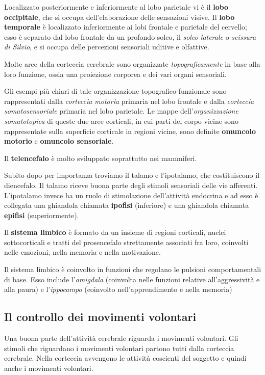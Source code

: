 \documentclass[]{article}
\begin{document}
Localizzato posteriormente e inferiormente al lobo parietale vi è il
\textbf{lobo occipitale}, che si occupa dell'elaborazione delle
sensazioni visive. Il \textbf{lobo temporale} è localizzato
inferiormente ai lobi frontale e parietale del cervello; esso è separato
dal lobo frontale da un profondo solco, il \emph{solco laterale} o
\emph{scissura di Silvio}, e si occupa delle percezioni sensoriali
uditive e olfattive.

Molte aree della corteccia cerebrale sono organizzate
\emph{topograficamente} in base alla loro funzione, ossia una proiezione
corporea e dei vari organi sensoriali.

Gli esempi più chiari di tale organizzazione topografico-funzionale sono
rappresentati dalla \emph{corteccia motoria} primaria nel lobo frontale
e dalla \emph{corteccia somatosensoriale} primaria nel lobo parietale.
Le mappe dell'\emph{organizzazione somatotopica} di queste due aree
corticali, in cui parti del corpo vicine sono rappresentate sulla
superficie corticale in regioni vicine, sono definite \textbf{omuncolo
motorio} e \textbf{omuncolo sensoriale}.

Il \textbf{telencefalo} è molto sviluppato soprattutto nei mammiferi.

Subito dopo per importanza troviamo il talamo e l'ipotalamo, che
costituiscono il diencefalo. Il talamo riceve buona parte degli stimoli
sensoriali delle vie afferenti. L'ipotalamo invece ha un ruolo di
stimolazione dell'attività endocrina e ad esso è collegata una ghiandola
chiamata \textbf{ipofisi} (inferiore) e una ghiandola chiamata
\textbf{epifisi} (superiormente).

Il \textbf{sistema limbico} è formato da un insieme di regioni
corticali, nuclei sottocorticali e tratti del prosencefalo strettamente
associati fra loro, coinvolti nelle emozioni, nella memoria e nella
motivazione.

Il sistema limbico è coinvolto in funzioni che regolano le pulsioni
comportamentali di base. Esso include l'\emph{amigdala} (coinvolta nelle
funzioni relative all'aggressività e alla paura) e l'\emph{ippocampo}
(coinvolto nell'apprendimento e nella memoria)

\subsection{Il controllo dei movimenti
volontari}\label{il-controllo-dei-movimenti-volontari}

Una buona parte dell'attività cerebrale riguarda i movimenti volontari.
Gli stimoli che riguardano i movimenti volontari partono tutti dalla
corteccia cerebrale. Nella corteccia avvengono le attività coscienti del
soggetto e quindi anche i movimenti volontari.
\end{document}
